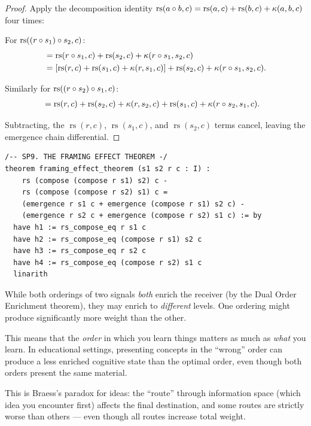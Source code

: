 \begin{proof}
Apply the decomposition identity $\operatorname{rs}(a \circ b, c) = \operatorname{rs}(a,c) + \operatorname{rs}(b,c) + \kappa(a,b,c)$ four times:

For $\operatorname{rs}((r \circ s_1) \circ s_2, c)$:
\begin{align*}
&= \operatorname{rs}(r \circ s_1, c) + \operatorname{rs}(s_2, c) + \kappa(r \circ s_1, s_2, c) \\
&= [\operatorname{rs}(r, c) + \operatorname{rs}(s_1, c) + \kappa(r, s_1, c)] + \operatorname{rs}(s_2, c) + \kappa(r \circ s_1, s_2, c).
\end{align*}

Similarly for $\operatorname{rs}((r \circ s_2) \circ s_1, c)$:
\begin{align*}
&= \operatorname{rs}(r, c) + \operatorname{rs}(s_2, c) + \kappa(r, s_2, c) + \operatorname{rs}(s_1, c) + \kappa(r \circ s_2, s_1, c).
\end{align*}

Subtracting, the $\operatorname{rs}(r,c)$, $\operatorname{rs}(s_1,c)$, and $\operatorname{rs}(s_2,c)$ terms cancel, leaving the emergence chain differential.
\end{proof}

\begin{lstlisting}
/-- SP9. THE FRAMING EFFECT THEOREM -/
theorem framing_effect_theorem (s1 s2 r c : I) :
    rs (compose (compose r s1) s2) c -
    rs (compose (compose r s2) s1) c =
    (emergence r s1 c + emergence (compose r s1) s2 c) -
    (emergence r s2 c + emergence (compose r s2) s1 c) := by
  have h1 := rs_compose_eq r s1 c
  have h2 := rs_compose_eq (compose r s1) s2 c
  have h3 := rs_compose_eq r s2 c
  have h4 := rs_compose_eq (compose r s2) s1 c
  linarith
\end{lstlisting}

\begin{paradox}
While both orderings of two signals \emph{both} enrich the receiver (by the Dual Order Enrichment theorem), they may enrich to \emph{different} levels. One ordering might produce significantly more weight than the other.

This means that the \emph{order} in which you learn things matters as much as \emph{what} you learn. In educational settings, presenting concepts in the ``wrong'' order can produce a less enriched cognitive state than the optimal order, even though both orders present the same material.

This is Braess's paradox for ideas: the ``route'' through information space (which idea you encounter first) affects the final destination, and some routes are strictly worse than others --- even though all routes increase total weight.
\end{paradox}

